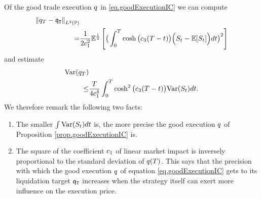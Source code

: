 \documentclass[10pt,a4paper]{article}
\begin{document}
\begin{remark}\label{remark.varianceOfLiquidationError}
Of the good trade execution  $\inventory$ in \eqref{eq.goodExecutionIC} we can compute 
\begin{equation*}
\begin{split}
\norm[\inventory_\timeHorizon-\liquidationTarget]_{\Ltwo(\Prob)} &\\
=& \frac{1}{2\coeffMarketImpact\squared} \Expectation^{\half}
\left[\big(
\int_{0}^{\timeHorizon} \cosh\big(\ratioAversionOverImpact (T-t)\big) \Big(
\fundamentalPrice_t-\Expectation[\fundamentalPrice_t]
\Big)dt
\big)\squared\right]
\end{split}
\end{equation*}
and estimate
\begin{equation*}
\begin{split}
\Variance(\inventory_\timeHorizon) &\\
\leq& \frac{T}{4\coeffMarketImpact^{4}} 
\int_{0}^{T} \cosh\squared\big(\ratioAversionOverImpact (T-t)\big) \Variance(\fundamentalPrice_t)dt.
\end{split}
\end{equation*}
We therefore remark the following two facts:
\begin{enumerate}
	\item The smaller $\int \Variance(\fundamentalPrice_t)dt$ is, the more precise the good execution $\inventory$ of Proposition \ref{prop.goodExecutionIC} is.
	\item The square of the coefficient $\coeffMarketImpact$ of linear market impact is inversely proportional to the standard deviation of $\inventory(T)$. This says that the precision with which the good execution $\inventory$ of equation \eqref{eq.goodExecutionIC} gets to its liquidation target $\liquidationTarget$ increases when the strategy itself can exert more influence on the execution price. 
\end{enumerate}
\end{remark}
\end{document}
